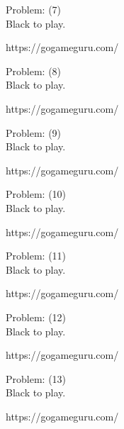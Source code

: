 \documentclass[11pt]{article}
\begin{document}
\begin{minipage}[t]{0.5\textwidth}
  {\centering
  
Problem: (7)\\
Black to play.

https://gogameguru.com/\\
  }
\end{minipage}
\begin{minipage}[t]{0.5\textwidth}
  {\centering
  
Problem: (8)\\
Black to play.

https://gogameguru.com/\\
  }
\end{minipage}
\begin{minipage}[t]{0.5\textwidth}
  {\centering
  
Problem: (9)\\
Black to play.

https://gogameguru.com/\\
  }
\end{minipage}
\begin{minipage}[t]{0.5\textwidth}
  {\centering
  
Problem: (10)\\
Black to play.

https://gogameguru.com/\\
  }
\end{minipage}
\begin{minipage}[t]{0.5\textwidth}
  {\centering
  
Problem: (11)\\
Black to play.

https://gogameguru.com/\\
  }
\end{minipage}
\begin{minipage}[t]{0.5\textwidth}
  {\centering
  
Problem: (12)\\
Black to play.

https://gogameguru.com/\\
  }
\end{minipage}
\begin{minipage}[t]{0.5\textwidth}
  {\centering
  
Problem: (13)\\
Black to play.

https://gogameguru.com/\\
  }
\end{minipage}
\end{document}
